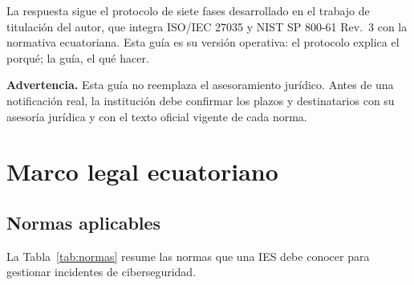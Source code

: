 \documentclass[11pt,a4paper,oneside]{report}
\begin{document}
La respuesta sigue el protocolo de siete fases desarrollado en el trabajo de titulación del autor, que integra ISO/IEC 27035 \cite{iso27035_2023} y NIST SP 800-61 Rev.~3 \cite{nist80061r3} con la normativa ecuatoriana. Esta guía es su versión operativa: el protocolo explica el porqué; la guía, el qué hacer.

\textbf{Advertencia.} Esta guía no reemplaza el asesoramiento jurídico. Antes de una notificación real, la institución debe confirmar los plazos y destinatarios con su asesoría jurídica y con el texto oficial vigente de cada norma.

\chapter{Marco legal ecuatoriano}
\label{cap:legal}
\section{Normas aplicables}
La Tabla~\ref{tab:normas} resume las normas que una IES debe conocer para gestionar incidentes de ciberseguridad.
\end{document}

